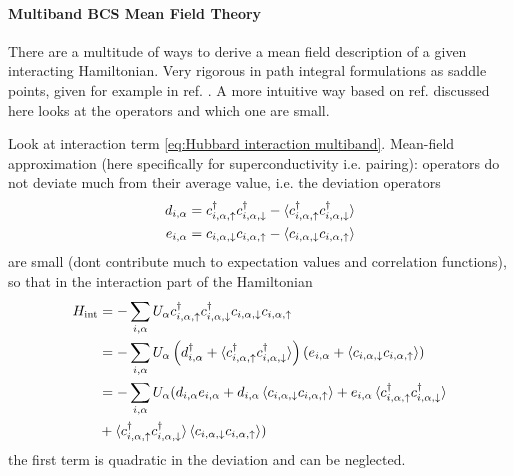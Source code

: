 \documentclass[../notes.tex]{subfiles}
\begin{document}
\paragraph{Multiband BCS Mean Field Theory}

There are a multitude of ways to derive a mean field description of a given interacting Hamiltonian.
Very rigorous in path integral formulations as saddle points, given for example in ref. \cite{colemanIntroductionManyBodyPhysics2015}.
A more intuitive way based on ref. \cite{bruusManyBodyQuantumTheory2004} discussed here looks at the operators and which one are small. 

Look at interaction term \cref{eq:Hubbard interaction multiband}.
Mean-field approximation (here specifically for superconductivity i.e. pairing): operators do not deviate much from their average value, i.e. the deviation operators 
\begin{align}
	d_{i, \alpha} = c_{i, \alpha, \uparrow}^{\dagger} c_{i, \alpha, \downarrow}^{\dagger} - \braket{c_{i, \alpha, \uparrow}^{\dagger} c_{i, \alpha, \downarrow}^{\dagger}} \\
	e_{i, \alpha} = c_{i, \alpha, \downarrow} c_{i, \alpha, \uparrow} - \braket{c_{i, \alpha, \downarrow} c_{i, \alpha, \uparrow}}
\end{align}
are small (dont contribute much to expectation values and correlation functions), so that in the interaction part of the Hamiltonian
\begin{align}
	H_{\mathrm{int}} &= -\sum_{i, \alpha} U_{\alpha} c_{i, \alpha, \uparrow}^{\dagger} c_{i, \alpha, \downarrow}^{\dagger} c_{i, \alpha, \downarrow} c_{i, \alpha, \uparrow} \\
	&= -\sum_{i, \alpha} U_{\alpha} 
	\left( d_{i, \alpha}^{\dagger} + \braket{c_{i, \alpha, \uparrow}^{\dagger} c_{i, \alpha, \downarrow}^{\dagger}} \right)
	\left( e_{i, \alpha} + \braket{c_{i, \alpha, \downarrow} c_{i, \alpha, \uparrow}} \right) \\
	&= -\sum_{i, \alpha} U_{\alpha} (
		d_{i, \alpha} e_{i, \alpha}
		+ d_{i, \alpha} \braket{c_{i, \alpha, \downarrow} c_{i, \alpha, \uparrow}}
		+ e_{i, \alpha} \braket{c_{i, \alpha, \uparrow}^{\dagger} c_{i, \alpha, \downarrow}^{\dagger}} \\
		&+ \braket{c_{i, \alpha, \uparrow}^{\dagger} c_{i, \alpha, \downarrow}^{\dagger}} \braket{c_{i, \alpha, \downarrow} c_{i, \alpha, \uparrow}} )
\end{align}
the first term is quadratic in the deviation and can be neglected.
\end{document}
